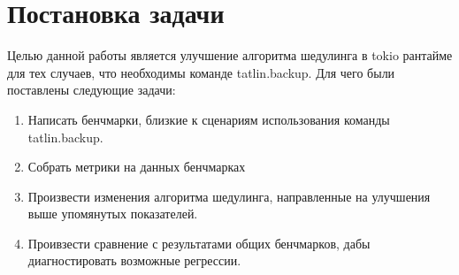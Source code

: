 
\section{Постановка задачи}
\label{sec:task}
Целью данной работы является улучшение алгоритма шедулинга в tokio рантайме для тех случаев, что необходимы команде tatlin.backup. Для чего были поставлены следующие задачи:

\begin{enumerate}
    \item Написать бенчмарки, близкие к сценариям использования команды tatlin.backup.
    \item Собрать метрики на данных бенчмарках
    \item Произвести изменения алгоритма шедулинга, направленные на улучшения выше упомянутых показателей.
    \item Проивзести сравнение с результатами общих бенчмарков, дабы диагностировать возможные регрессии.
\end{enumerate}
